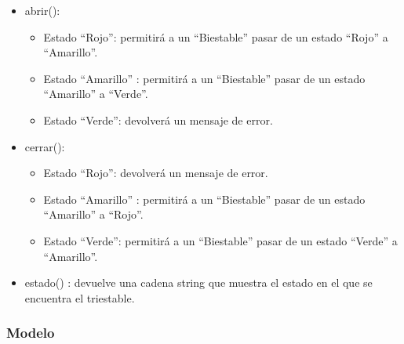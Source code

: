 \documentclass[11pt,a4paper]{article}
\begin{document}
\begin{itemize}
\item abrir():

	\begin{itemize}
	\item Estado ``Rojo'': permitirá a un ``Biestable'' pasar de un estado ``Rojo'' a ``Amarillo''.
	\item Estado ``Amarillo'' : permitirá a un ``Biestable'' pasar de un estado ``Amarillo'' a ``Verde''.

	\item Estado ``Verde'': devolverá un mensaje de error.
	\end{itemize}
	
\item cerrar():

	\begin{itemize}
	\item Estado ``Rojo'': devolverá un mensaje de error.
	\item Estado ``Amarillo'' : permitirá a un ``Biestable'' pasar de un estado ``Amarillo'' a ``Rojo''.
	\item Estado ``Verde'':  permitirá a un ``Biestable'' pasar de un estado ``Verde'' a ``Amarillo''.

	\end{itemize}
	
\item estado() : devuelve una cadena string que muestra el estado en el que se encuentra el triestable.
\end{itemize}

\subsubsection{Modelo}

\begin{figure}[H]
\end{figure}
\end{document}
